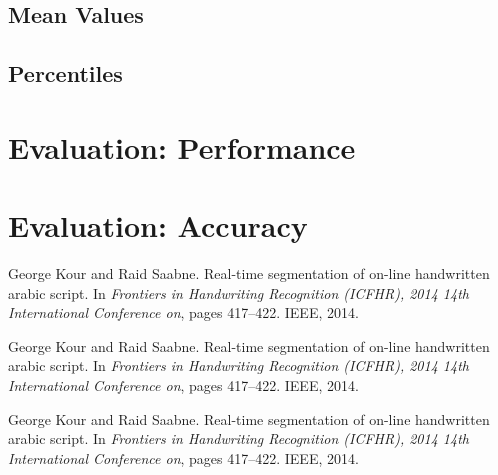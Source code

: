 \documentclass{article}
\theoremstyle{plain}
\begin{document}
\subsection{Mean Values}

\subsection{Percentiles}

\section{Evaluation: Performance}

\section{Evaluation: Accuracy}



\begin{thebibliography}{1}

George Kour and Raid Saabne.
\newblock Real-time segmentation of on-line handwritten arabic script.
\newblock In {\em Frontiers in Handwriting Recognition (ICFHR), 2014 14th
  International Conference on}, pages 417--422. IEEE, 2014.

George Kour and Raid Saabne.
\newblock Real-time segmentation of on-line handwritten arabic script.
\newblock In {\em Frontiers in Handwriting Recognition (ICFHR), 2014 14th
  International Conference on}, pages 417--422. IEEE, 2014.

George Kour and Raid Saabne.
\newblock Real-time segmentation of on-line handwritten arabic script.
\newblock In {\em Frontiers in Handwriting Recognition (ICFHR), 2014 14th
  International Conference on}, pages 417--422. IEEE, 2014.

\end{thebibliography}
\end{document}
